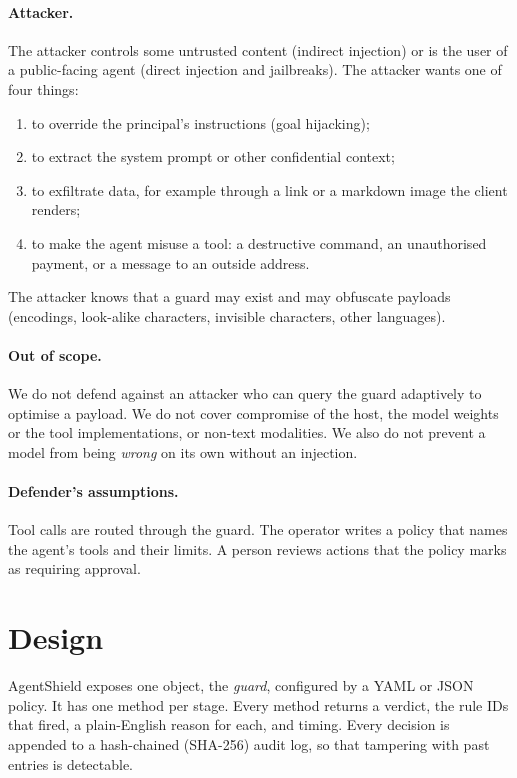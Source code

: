 \documentclass[10pt]{article}
\begin{document}
\paragraph{Attacker.} The attacker controls some untrusted content (indirect injection) or is the user of a public-facing agent (direct injection and jailbreaks). The attacker wants one of four things:
\begin{enumerate}[label=(\roman*)]
\item to override the principal's instructions (goal hijacking);
\item to extract the system prompt or other confidential context;
\item to exfiltrate data, for example through a link or a markdown image the client renders;
\item to make the agent misuse a tool: a destructive command, an unauthorised payment, or a message to an outside address.
\end{enumerate}
The attacker knows that a guard may exist and may obfuscate payloads (encodings, look-alike characters, invisible characters, other languages).

\paragraph{Out of scope.} We do not defend against an attacker who can query the guard adaptively to optimise a payload. We do not cover compromise of the host, the model weights or the tool implementations, or non-text modalities. We also do not prevent a model from being \emph{wrong} on its own without an injection.

\paragraph{Defender's assumptions.} Tool calls are routed through the guard. The operator writes a policy that names the agent's tools and their limits. A person reviews actions that the policy marks as requiring approval.

\section{Design}
\label{sec:design}
AgentShield exposes one object, the \emph{guard}, configured by a YAML or JSON policy. It has one method per stage. Every method returns a verdict, the rule IDs that fired, a plain-English reason for each, and timing. Every decision is appended to a hash-chained (SHA-256) audit log, so that tampering with past entries is detectable.
\end{document}
